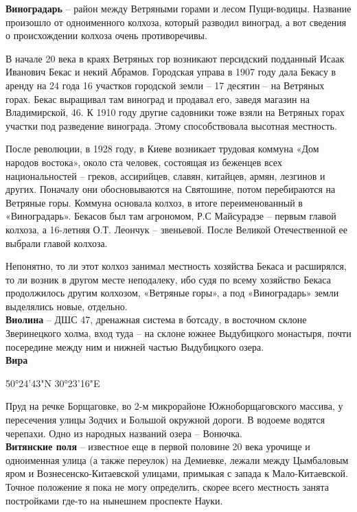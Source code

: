 \textbf{Виноградарь} – район между Ветряными горами и лесом Пущи-водицы. Название произошло от одноименного колхоза, который разводил виноград, а вот сведения о происхождении колхоза очень противоречивы.

В начале 20 века в краях Ветряных гор возникают персидский подданный Исаак Иванович Бекас и некий Абрамов. Городская управа в 1907 году дала Бекасу в аренду на 24 года 16 участков городской земли – 17 десятин – на Ветряных горах. Бекас выращивал там виноград и продавал его, заведя магазин на Владимирской, 46. К 1910 году другие садовники тоже взяли на Ветряных горах участки под разведение винограда. Этому способствовала высотная местность.

После революции, в 1928 году, в Киеве возникает трудовая коммуна «Дом народов востока», около ста человек, состоящая из беженцев всех национальностей – греков, ассирийцев, славян, китайцев, армян, лезгинов и других. Поначалу они обосновываются на Святошине, потом перебираются на Ветряные горы. Коммуна основала колхоз, в итоге переименованный в «Виноградарь». Бекасов был там агрономом, Р.С Майсурадзе – первым главой колхоза, а 16-летняя О.Т. Леончук – звеньевой. После Великой Отечественной ее выбрали главой колхоза.

Непонятно, то ли этот колхоз занимал местность хозяйства Бекаса и расширялся, то ли возник в другом месте неподалеку, ибо судя по всему хозяйство Бекаса продолжилось другим колхозом, «Ветряные горы», а под «Виноградарь» земли выделялись новые, отдельно.\\ 

\textbf{Виолина} – ДШС 47, дренажная система в ботсаду, в восточном склоне Зверинецкого холма, вход туда – на склоне южнее Выдубицкого монастыря, почти посередине между ним и нижней частью Выдубицкого озера.\\

\textbf{Вира} 

50°24'43"N 30°23'16"E

Пруд на речке Борщаговке, во 2-м микрорайоне Южноборщаговского массива, у пересечения улицы Зодчих и Большой окружной дороги. В водоеме водятся черепахи. Одно из народных названий озера – Вонючка.\\

\textbf{Витянские поля} – известное еще в первой половине 20 века урочище и одноименная улица (а также переулок) на Демиевке, лежали между Цымбаловым яром и Вознесенско-Китаевской улицами, примыкая с запада к Ма\-ло-Китаевской. Точное положение я пока не могу определить, скорее всего местность занята постройками где-то на нынешнем проспекте Науки.\\

